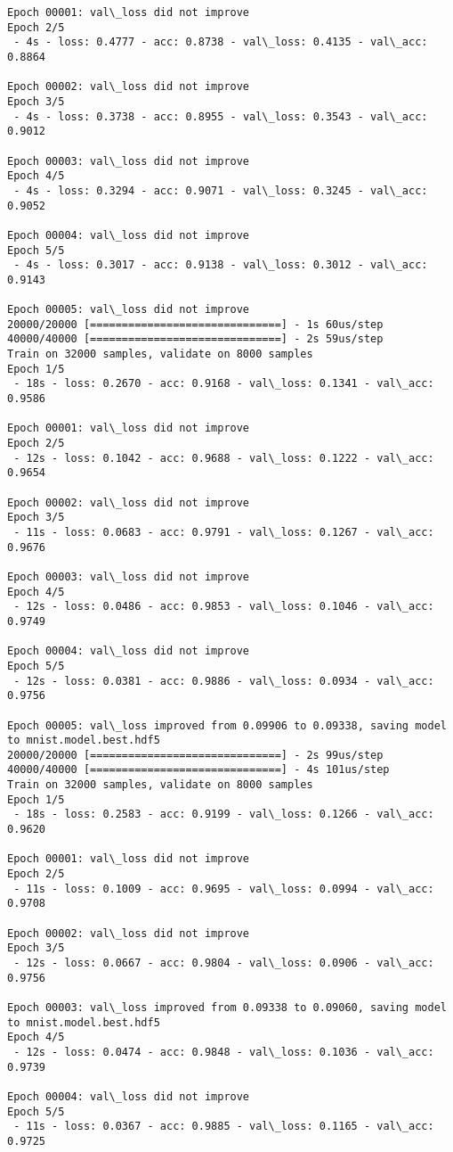 \documentclass[11pt]{article}
\begin{document}
\begin{Verbatim}[commandchars=\\\{\}]
Epoch 00001: val\_loss did not improve
Epoch 2/5
 - 4s - loss: 0.4777 - acc: 0.8738 - val\_loss: 0.4135 - val\_acc: 0.8864

Epoch 00002: val\_loss did not improve
Epoch 3/5
 - 4s - loss: 0.3738 - acc: 0.8955 - val\_loss: 0.3543 - val\_acc: 0.9012

Epoch 00003: val\_loss did not improve
Epoch 4/5
 - 4s - loss: 0.3294 - acc: 0.9071 - val\_loss: 0.3245 - val\_acc: 0.9052

Epoch 00004: val\_loss did not improve
Epoch 5/5
 - 4s - loss: 0.3017 - acc: 0.9138 - val\_loss: 0.3012 - val\_acc: 0.9143

Epoch 00005: val\_loss did not improve
20000/20000 [==============================] - 1s 60us/step
40000/40000 [==============================] - 2s 59us/step
Train on 32000 samples, validate on 8000 samples
Epoch 1/5
 - 18s - loss: 0.2670 - acc: 0.9168 - val\_loss: 0.1341 - val\_acc: 0.9586

Epoch 00001: val\_loss did not improve
Epoch 2/5
 - 12s - loss: 0.1042 - acc: 0.9688 - val\_loss: 0.1222 - val\_acc: 0.9654

Epoch 00002: val\_loss did not improve
Epoch 3/5
 - 11s - loss: 0.0683 - acc: 0.9791 - val\_loss: 0.1267 - val\_acc: 0.9676

Epoch 00003: val\_loss did not improve
Epoch 4/5
 - 12s - loss: 0.0486 - acc: 0.9853 - val\_loss: 0.1046 - val\_acc: 0.9749

Epoch 00004: val\_loss did not improve
Epoch 5/5
 - 12s - loss: 0.0381 - acc: 0.9886 - val\_loss: 0.0934 - val\_acc: 0.9756

Epoch 00005: val\_loss improved from 0.09906 to 0.09338, saving model to mnist.model.best.hdf5
20000/20000 [==============================] - 2s 99us/step
40000/40000 [==============================] - 4s 101us/step
Train on 32000 samples, validate on 8000 samples
Epoch 1/5
 - 18s - loss: 0.2583 - acc: 0.9199 - val\_loss: 0.1266 - val\_acc: 0.9620

Epoch 00001: val\_loss did not improve
Epoch 2/5
 - 11s - loss: 0.1009 - acc: 0.9695 - val\_loss: 0.0994 - val\_acc: 0.9708

Epoch 00002: val\_loss did not improve
Epoch 3/5
 - 12s - loss: 0.0667 - acc: 0.9804 - val\_loss: 0.0906 - val\_acc: 0.9756

Epoch 00003: val\_loss improved from 0.09338 to 0.09060, saving model to mnist.model.best.hdf5
Epoch 4/5
 - 12s - loss: 0.0474 - acc: 0.9848 - val\_loss: 0.1036 - val\_acc: 0.9739

Epoch 00004: val\_loss did not improve
Epoch 5/5
 - 11s - loss: 0.0367 - acc: 0.9885 - val\_loss: 0.1165 - val\_acc: 0.9725


\end{Verbatim}
\end{document}
